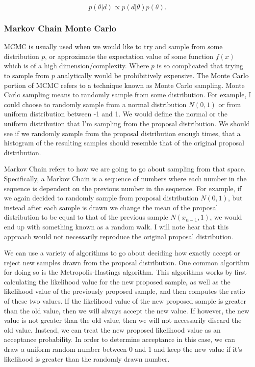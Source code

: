 \begin{equation}
    p(\theta | d) \propto p(d | \theta) p(\theta).
\end{equation}

\subsubsection{Markov Chain Monte Carlo}

%
\ac{MCMC} is usually used when we would like to try and sample from some distribution $p$, or approximate the expectation value of some function $f(x)$ which is of a high dimension/complexity. Where $p$ is so complicated that trying to sample from $p$ analytically would be prohibitively expensive. The Monte Carlo portion of \ac{MCMC} refers to a technique known as Monte Carlo sampling. Monte Carlo sampling means to randomly sample from some distribution. For example, I could choose to randomly sample from a normal distribution $N(0,1)$ or from uniform distribution between -1 and 1. We would define the normal or the uniform distribution that I'm sampling from the proposal distribution. We should see if we randomly sample from the proposal distribution enough times, that a histogram of the resulting samples should resemble that of the original proposal distribution. 

%
%
Markov Chain refers to how we are going to go about sampling from that space. Specifically, a Markov Chain is a sequence of numbers where each number in the sequence is dependent on the previous number in the sequence. For example, if we again decided to randomly sample from proposal distribution $N(0,1)$, but instead after each sample is drawn we change the mean of the proposal distribution to be equal to that of the previous sample $N(x_{n-1},1)$, we would end up with something known as a random walk. I will note hear that this approach would not necessarily reproduce the original proposal distribution.

%
%

We can use a variety of algorithms to go about deciding how exactly accept or reject new samples drawn from the proposal distribution. One common algorithm for doing so is the Metropolis-Hastings algorithm. This algorithms works by first calculating the likelihood value for the new proposed sample, as well as the likelihood value of the previously proposed sample, and then computes the ratio of these two values. If the likelihood value of the new proposed sample is greater than the old value, then we will always accept the new value. If however, the new value is not greater than the old value, then we will not necessarily discard the old value. Instead, we can treat the new proposed likelihood value as an acceptance probability. In order to determine acceptance in this case, we can draw a uniform random number between 0 and 1 and keep the new value if it's likelihood is greater than the randomly drawn number.

